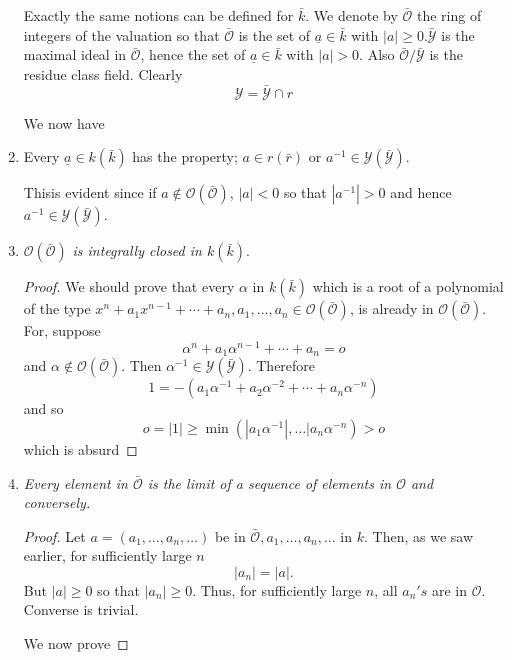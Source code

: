 \begin{enumerate}[1)]
 Exactly the same notions can be defined for $\bar{k}$. We denote by
 $\bar{\mathscr{O}}$ the ring of integers of the valuation so that
 $\bar{\mathscr{O}}$  is the set of $\underline{a} \in \bar{k}$ with
 $|a| \ge 0. \bar{\mathscr{Y}}$ is the maximal ideal in
 $\bar{\mathscr{O}}$, hence the set of  $\underline{a} \in \bar{k}$
 with $|a| > 0$. Also $\bar{\mathscr{O}}/ \bar{\mathscr{Y}}$ is the
 residue class field. Clearly 
 $$
 \mathscr{Y} = \bar{\mathscr{Y}} \cap r
 $$
 
 We now have

 \item Every $\underline{a} \in k (\bar{k})$ has the property; $a
   \in r (\bar{r})$ or $a^{-1} \in \mathscr{Y} (\bar{\mathscr{Y}})$. 
 
 This\pageoriginale is evident since if $a \notin \mathscr{O}
 (\bar{\mathscr{O}})$,  $|a| < 0$ so that $|a^{-1}| > 0$ and hence
 $a^{-1} \in \mathscr{Y}  (\bar{\mathscr{Y}})$.  

 \item $\mathscr{O} (\bar{\mathscr{O}})$ \textit{is integrally closed
   in $k (\bar{k})$}. 

\begin{proof}%
We should prove that every $\alpha$ in $k (\bar{k})$ which is a root
of a polynomial of the type $x^n + a_1 x^{n-1} + \cdots + a_n , a_1 ,
\ldots, a_n \in \mathscr{O} (\bar{\mathscr{O}})$, is already in
$\mathscr{O} (\bar{\mathscr{O}})$. For, suppose 
$$
\alpha^n + a_1 \alpha^{n-1} + \cdots + a_n = o
$$
and $\alpha \notin \mathscr{O} (\bar{\mathscr{O}})$. Then $\alpha^{-1}
\in \mathscr{Y} (\bar{\mathscr{Y}})$. Therefore 
$$
1 = -(a_1 \alpha^{-1} + a_2 \alpha^{-2} + \cdots + a_n \alpha^{-n}) 
$$
and so 
$$
o = |1| \ge \min (|a_1 \alpha^{-1}|, \ldots | a_n \alpha^{-n}) > o 
$$
which is absurd
\end{proof}

\item \textit{Every element in $\bar{\mathscr{O}}$ is the limit of a
  sequence of elements in $\mathscr{O}$ and conversely.} 

\begin{proof}%
Let $a = (a_1, \ldots , a_n , \ldots)$ be in $\bar{\mathscr{O}}, a_1,
\ldots , a_n , \ldots$ in $k$. Then, as we saw earlier, for
sufficiently large $n$ 
$$
|a_n| = |a|.
$$
But $|a| \ge 0$ so that $|a_n| \ge 0$. Thus, for sufficiently large
$n$, all $a_n 's$ are in $\mathscr{O}$. Converse is trivial. 

We now prove
\end{proof}


\end{enumerate}

